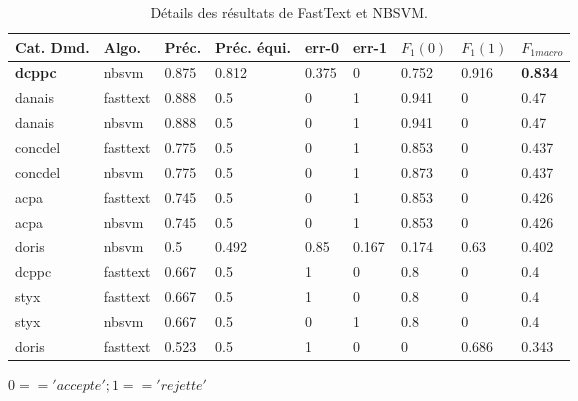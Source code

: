  \begin{table}[htb]
 	\footnotesize \centering
 	\begin{tabular}{|l|l|l|l|l|l|l|l|l|}
 		\hline
 	\textbf{Cat. Dmd.} & \textbf{Algo.} & \textbf{Préc.} & \textbf{Préc. équi.} & \textbf{err-0} & \textbf{err-1} & $F_1(0)$ & $F_1(1)$ & \textbf{$F_{1macro}$} \\ \hline
 	\textbf{dcppc} & nbsvm & 0.875 & 0.812 & 0.375 & 0 & 0.752 & 0.916 & \textbf{0.834} \\ \hline
 	danais & fasttext & 0.888 & 0.5 & 0 & 1 & 0.941 & 0 & 0.47 \\ \hline
 	danais & nbsvm & 0.888 & 0.5 & 0 & 1 & 0.941 & 0 & 0.47 \\ \hline
 	concdel & fasttext & 0.775 & 0.5 & 0 & 1 & 0.853 & 0 & 0.437 \\ \hline
 	concdel & nbsvm & 0.775 & 0.5 & 0 & 1 & 0.873 & 0 & 0.437 \\ \hline
 	acpa & fasttext & 0.745 & 0.5 & 0 & 1 & 0.853 & 0 & 0.426 \\ \hline
 	acpa & nbsvm & 0.745 & 0.5 & 0 & 1 & 0.853 & 0 & 0.426 \\ \hline
 	doris & nbsvm & 0.5 & 0.492 & 0.85 & 0.167 & 0.174 & 0.63 & 0.402 \\ \hline
 	dcppc & fasttext & 0.667 & 0.5 & 1 & 0 & 0.8 & 0 & 0.4 \\ \hline
 	styx & fasttext & 0.667 & 0.5 & 1 & 0 & 0.8 & 0 & 0.4 \\ \hline
 	styx & nbsvm & 0.667 & 0.5 & 0 & 1 & 0.8 & 0 & 0.4 \\ \hline
 	doris & fasttext & 0.523 & 0.5 & 1 & 0 & 0 & 0.686 & 0.343 \\ \hline
 	\end{tabular}
 	
 $0 == 'accepte'; 1 == 'rejette'$

\caption{Détails des résultats de FastText et NBSVM.}\label{tab:sensrst:fasttextnbsvm}
 \end{table}

